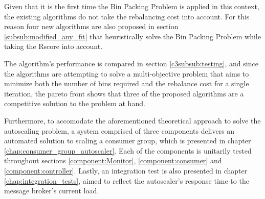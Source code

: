 Given that it is the first time the Bin Packing Problem is applied in this
context, the existing algorithms do not take the rebalancing cost into account.
For this reason four new algorithms are also proposed in section
\ref{subsub:modified_any_fit} that heuristically solve the Bin Packing Problem
while taking the Rscore into account. 

The algorithm's performance is compared in section \ref{c3subsub:testing}, and
since the algorithms are attempting to solve a multi-objective problem that aims
to minimize both the number of bins required and the rebalance cost for a single
iteration, the pareto front shows that three of the proposed algorithms are a
competitive solution to the problem at hand.

Furthermore, to accomodate the aforementioned theoretical approach to solve the
autoscaling problem, a system comprised of three components delivers an
automated solution to scaling a consumer group, which is presented in chapter
\ref{chap:consumer_group_autoscaler}. Each of the components is unitarily tested throughout
sections \ref{component:Monitor}, \ref{component:consumer} and
\ref{component:controller}. Lastly, an integration test is also presented in
chapter \ref{chap:integration_tests}, aimed to reflect the autoscaler's response
time to the message broker's current load.


